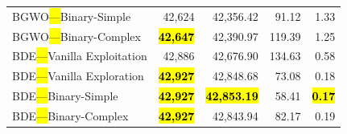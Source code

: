 \documentclass[mathematics,article,accept,moreauthors]{Definitions/mdpi}
\begin{document}
\begin{table}[H]
\begin{tabularx}{\textwidth}{lRRRR}
    BGWO\hl{---}Binary-Simple        &          42,624 &         42,356.42 &  91.12 &         1.33 \\
    BGWO\hl{---}Binary-Complex       & \textbf{\hl{42,647}} &         42,390.97 & 119.39 &         1.25 \\
    \midrule
    BDE\hl{---}Vanilla Exploitation  &          42,886 &         42,676.90 & 134.63 &         0.58 \\
    BDE\hl{---}Vanilla Exploration   & \textbf{\hl{42,927}} &         42,848.68 &  73.08 &         0.18 \\
    BDE\hl{---}Binary-Simple         & \textbf{\hl{42,927}} & \textbf{\hl{42,853.19}} &  58.41 & \textbf{\hl{0.17}} \\
    BDE\hl{---}Binary-Complex        & \textbf{\hl{42,927}} &         42,843.94 &  82.17 &         0.19 \\
    \bottomrule
  \end{tabularx}
\end{table}

\vspace{-9pt}
\end{document}
